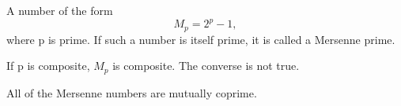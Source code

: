  A number of the form $$M_{p}=2^{p}-1,$$   where p is prime. If such a
number is itself prime, it is called a Mersenne prime.
\par
If p is composite, $M_{p}$  is composite. The converse is not true.
\par
All of the Mersenne numbers are mutually coprime.
